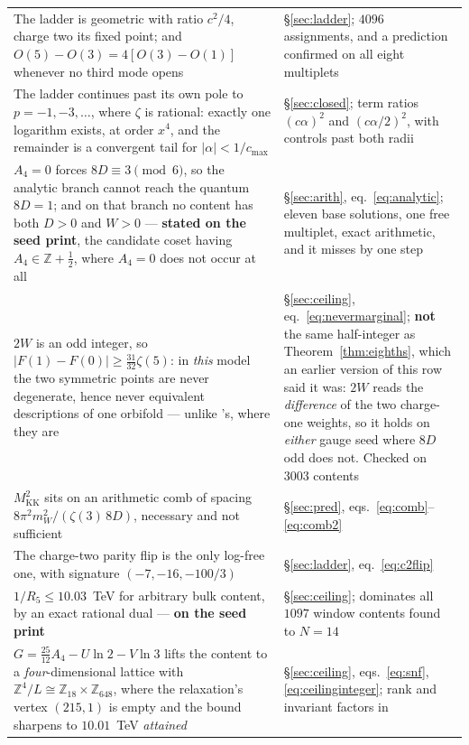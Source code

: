 \documentclass[11pt,a4paper]{article}
\newcommand{\ZZ}{\mathbb{Z}}
\begin{document}
\begin{longtable}{p{}p{}}
The ladder is geometric with ratio $c^2/4$, charge two its fixed point; and
$O(5)-O(3)=4[O(3)-O(1)]$ whenever no third mode opens & \S\ref{sec:ladder}; $4096$ assignments,
and a prediction confirmed on all eight multiplets\\
The ladder continues past its own pole to $p=-1,-3,\dots$, where $\zeta$ is rational: exactly one
logarithm exists, at order $x^4$, and the remainder is a convergent tail for $|\alpha|<1/c_{\max}$ &
\S\ref{sec:closed}; term ratios $(c\alpha)^2$ and $(c\alpha/2)^2$, with controls past both radii\\
$A_4=0$ forces $8D\equiv3\pmod6$, so the analytic branch cannot reach the quantum $8D=1$; and on
that branch no content has both $D>0$ and $W>0$ --- \textbf{stated on the seed \cite{KM25}
print}, the candidate coset having $A_4\in\ZZ+\tfrac12$, where $A_4=0$ does not occur at all &
\S\ref{sec:arith},
eq.~\eqref{eq:analytic}; eleven base solutions, one free multiplet, exact arithmetic, and it misses
by one step\\
$2W$ is an odd integer, so $|F(1)-F(0)|\ge\tfrac{31}{32}\zeta(5)$: in \emph{this} model the two
symmetric points are never degenerate, hence never equivalent descriptions of one orbifold ---
unlike \cite{CCD24}'s, where they are &
\S\ref{sec:ceiling}, eq.~\eqref{eq:nevermarginal}; \textbf{not} the same half-integer as
Theorem~\ref{thm:eighths}, which an earlier version of this row said it was: $2W$ reads the
\emph{difference} of the two charge-one weights, so it holds on \emph{either} gauge seed where
$8D$ odd does not. Checked on $3003$ contents\\
$M_{\mathrm{KK}}^2$ sits on an arithmetic comb of spacing $8\pi^2m_W^2/(\zeta(3)\,8D)$, necessary and
not sufficient & \S\ref{sec:pred}, eqs.~\eqref{eq:comb}--\eqref{eq:comb2}\\
The charge-two parity flip is the only log-free one, with signature $(-7,-16,-100/3)$ &
\S\ref{sec:ladder}, eq.~\eqref{eq:c2flip}\\
$1/R_5\le10.03$~TeV for arbitrary bulk content, by an exact rational dual --- \textbf{on the seed \cite{KM25} print} & \S\ref{sec:ceiling};
dominates all $1097$ window contents found to $N=14$\\
$G=\tfrac{25}{12}A_4-U\ln2-V\ln3$ lifts the content to a \emph{four}-dimensional lattice with
$\ZZ^4/L\cong\ZZ_{18}\times\ZZ_{648}$, where the relaxation's vertex $(215,1)$ is empty and the
bound sharpens to $10.01$~TeV \emph{attained} & \S\ref{sec:ceiling},
eqs.~\eqref{eq:snf}, \eqref{eq:ceilinginteger}; rank and invariant factors in

\end{longtable}
\end{document}
